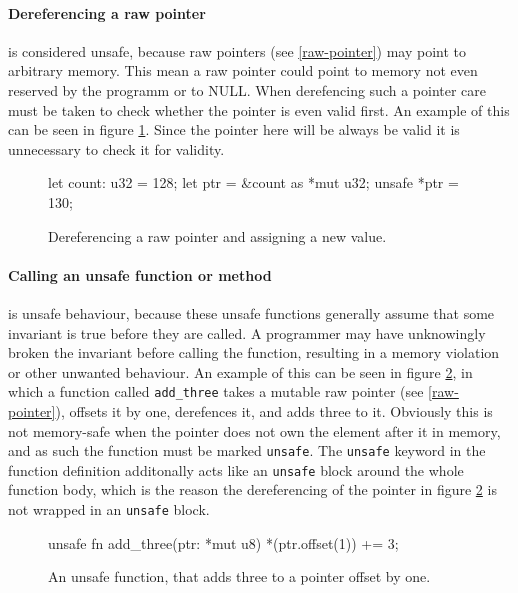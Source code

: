 \documentclass[twocolumn]{article}
\begin{document}
\paragraph{Dereferencing a raw pointer} is considered unsafe, because raw pointers (see \ref{raw-pointer}) may point to arbitrary memory.
This mean a raw pointer could point to memory not even reserved by the programm or to NULL.
When derefencing such a pointer care must be taken to check whether the pointer is even valid first.
An example of this can be seen in figure \ref{unsafe-derefencing}.
Since the pointer here will be always be valid it is unnecessary to check it for validity.
\begin{figure}
\begin{rustcode}
let count: u32 = 128;
let ptr = &count as *mut u32;
unsafe {
    *ptr = 130;
}
\end{rustcode}
\vspace{-2em}
\caption{Dereferencing a raw pointer and assigning a new value.}
\label{unsafe-derefencing}
\end{figure}
\paragraph{Calling an unsafe function or method} is unsafe behaviour, because these unsafe functions generally assume that some invariant is true before they are called.
A programmer may have unknowingly broken the invariant before calling the function, resulting in a memory violation or other unwanted behaviour.
An example of this can be seen in figure \ref{unsafe-function}, in which a function called \texttt{add_three} takes a mutable raw pointer (see \ref{raw-pointer}), offsets it by one, derefences it, and adds three to it.
Obviously this is not memory-safe when the pointer does not own the element after it in memory, and as such the function must be marked \texttt{unsafe}.
The \texttt{unsafe} keyword in the function definition additonally acts like an \texttt{unsafe} block around the whole function body, which is the reason the dereferencing of the pointer in figure \ref{unsafe-function} is not wrapped in an \texttt{unsafe} block.
\begin{figure}
\begin{rustcode}
unsafe fn add_three(ptr: *mut u8) {
        *(ptr.offset(1)) += 3;
}
\end{rustcode}
\vspace{-2em}
\caption{An unsafe function, that adds three to a pointer offset by one.}
\label{unsafe-function}
\end{figure}
\end{document}
